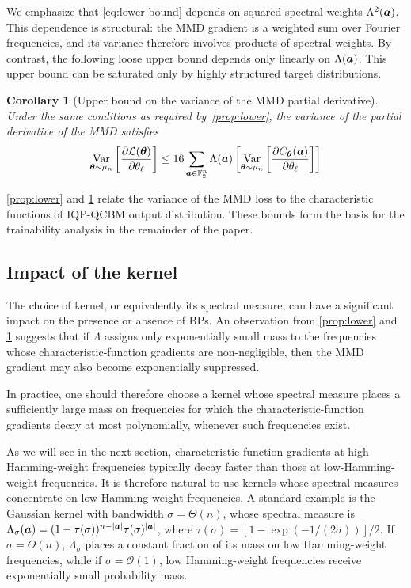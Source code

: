 \documentclass{article}
\theoremstyle{plain}
\newtheorem{corollary}[theorem]{Corollary}
\theoremstyle{definition}
\theoremstyle{remark}
\begin{document}
We emphasize that \cref{eq:lower-bound} depends on squared spectral weights $\Lambda^2({\bm{a}})$. This dependence is structural: the MMD gradient is a weighted sum over Fourier frequencies, and its variance therefore involves products of spectral weights. By contrast, the following loose upper bound depends only linearly on $\Lambda({\bm{a}})$. This upper bound can be saturated only by highly structured target distributions.
\begin{corollary}[Upper bound on the variance of the MMD partial derivative] \label{prop:upper} 
Under the same conditions as required by~\cref{prop:lower}, the variance of the partial derivative of the MMD satisfies
\begin{equation}
    \operatorname*{Var}_{{\bm{\theta}} \sim\mu_n} \left[ \frac{\partial \mathcal{L}({\bm{\theta}})}{\partial \theta_\ell} \right] \leq 16 \sum_{{\bm{a}}\in \mathbb{F}_2^n} \Lambda({\bm{a}})\left[  \operatorname*{Var}_{{\bm{\theta}}\sim\mu_n} \left[ \frac{\partial C_{\bm{\theta}}({\bm{a}})}{\partial \theta_\ell} \right]\right]
\end{equation}
\end{corollary}
\cref{prop:lower} and \cref{prop:upper} relate the variance of the MMD loss to the characteristic functions of IQP-QCBM output distribution. These bounds form the basis for the trainability analysis in the remainder of the paper.

\subsection{Impact of the kernel}
\label{subsec:kernel-choice}
The choice of kernel, or equivalently its spectral measure, can have a significant impact on the presence or absence of BPs. An observation from \cref{prop:lower} and \cref{prop:upper} suggests that if $\Lambda$ assigns only exponentially small mass to the frequencies whose characteristic-function gradients are non-negligible, then the MMD gradient may also become exponentially suppressed. 

In practice, one should therefore choose a kernel whose spectral measure places a sufficiently large mass on frequencies for which the characteristic-function gradients decay at most polynomially, whenever such frequencies exist. 

As we will see in the next section, characteristic-function gradients at high Hamming-weight frequencies typically decay faster than those at low-Hamming-weight frequencies. It is therefore natural to use kernels whose spectral measures concentrate on low-Hamming-weight frequencies. A standard example is the Gaussian kernel with bandwidth $\sigma=\Theta(n)$, whose spectral measure is $\Lambda_\sigma({\bm{a}}) = (1-\tau(\sigma))^{n-\abs{{\bm{a}}}} \tau(\sigma)^\abs{{\bm{a}}}$, where $\tau(\sigma) = [1-\exp(-1/(2 \sigma))]/2$. If $\sigma=\Theta(n)$, $\Lambda_\sigma$ places a constant fraction of its mass on low Hamming-weight frequencies, while if $\sigma=\mathcal{O}(1)$, low Hamming-weight frequencies receive exponentially small probability mass.
\end{document}
